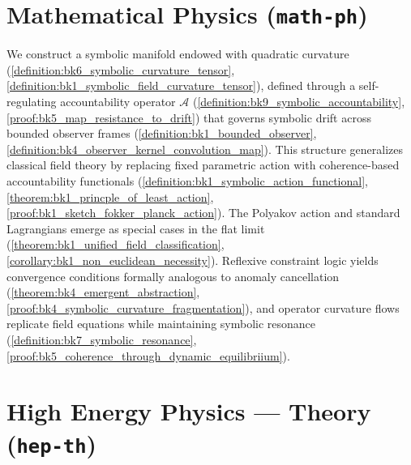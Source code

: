 \section*{Mathematical Physics (\texttt{math-ph})}
\label{abs:mathphys}

We construct a symbolic manifold endowed with quadratic curvature (\ref{definition:bk6_symbolic_curvature_tensor}, \ref{definition:bk1_symbolic_field_curvature_tensor}), defined through a self-regulating accountability operator $\mathcal{A}$ (\ref{definition:bk9_symbolic_accountability}, \ref{proof:bk5_map_resistance_to_drift}) that governs symbolic drift across bounded observer frames (\ref{definition:bk1_bounded_observer}, \ref{definition:bk4_observer_kernel_convolution_map}). This structure generalizes classical field theory by replacing fixed parametric action with coherence-based accountability functionals (\ref{definition:bk1_symbolic_action_functional}, \ref{theorem:bk1_princple_of_least_action}, \ref{proof:bk1_sketch_fokker_planck_action}). The Polyakov action and standard Lagrangians emerge as special cases in the flat limit (\ref{theorem:bk1_unified_field_classification}, \ref{corollary:bk1_non_euclidean_necessity}). Reflexive constraint logic yields convergence conditions formally analogous to anomaly cancellation (\ref{theorem:bk4_emergent_abstraction}, \ref{proof:bk4_symbolic_curvature_fragmentation}), and operator curvature flows replicate field equations while maintaining symbolic resonance (\ref{definition:bk7_symbolic_resonance}, \ref{proof:bk5_coherence_through_dynamic_equilibriium}).

\section*{High Energy Physics — Theory (\texttt{hep-th})}
\label{abs:hep}

